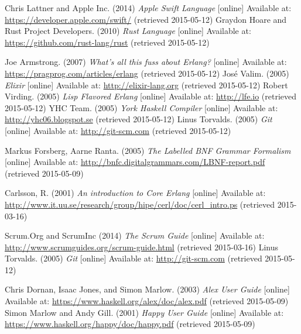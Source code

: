 \begin{thebibliography}{69}

 Chris Lattner and Apple Inc. (2014) \textit{Apple Swift Language} [online] Available at: \url{https://developer.apple.com/swift/} (retrieved 2015-05-12)
 Graydon Hoare and Rust Project Developers. (2010) \textit{Rust Language} [online] Available at: \url{https://github.com/rust-lang/rust} (retrieved 2015-05-12)

 Joe Armstrong. (2007) \textit{What's all this fuss about Erlang?} [online] Available at: \url{https://pragprog.com/articles/erlang} (retrieved 2015-05-12)
  José Valim. (2005) \textit{Elixir} [online] Available at: \url{http://elixir-lang.org} (retrieved 2015-05-12)
  Robert Virding. (2005) \textit{Lisp Flavored Erlang} [online] Available at: \url{http://lfe.io} (retrieved 2015-05-12)
  YHC Team. (2005) \textit{York Haskell Compiler} [online] Available at: \url{http://yhc06.blogspot.se} (retrieved 2015-05-12)
  Linus Torvalds. (2005) \textit{Git} [online] Available at: \url{http://git-scm.com} (retrieved 2015-05-12)

 Markus Forsberg, Aarne Ranta. (2005) \textit{The Labelled BNF Grammar Formalism} [online] Available at: \url{http://bnfc.digitalgrammars.com/LBNF-report.pdf} (retrieved 2015-05-09)

 Carlsson, R. (2001) \textit{An introduction to Core Erlang} [online] Available at: \url{http://www.it.uu.se/research/group/hipe/cerl/doc/cerl_intro.ps} (retrieved 2015-03-16)


 Scrum.Org and ScrumInc (2014) \textit{The Scrum Guide} [online] Available at: \url{http://www.scrumguides.org/scrum-guide.html} (retrieved 2015-03-16)
  Linus Torvalds. (2005) \textit{Git} [online] Available at: \url{http://git-scm.com} (retrieved 2015-05-12)

 Chris Dornan, Isaac Jones, and Simon Marlow. (2003) \textit{Alex User Guide} [online] Available at: \url{https://www.haskell.org/alex/doc/alex.pdf} (retrieved 2015-05-09)
 Simon Marlow and Andy Gill. (2001) \textit{Happy User Guide} [online] Available at: \url{https://www.haskell.org/happy/doc/happy.pdf} (retrieved 2015-05-09)



\end{thebibliography}

